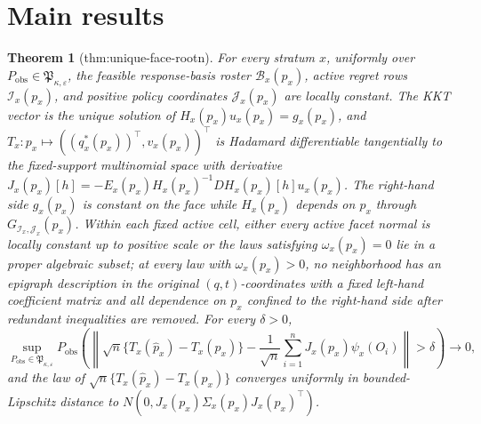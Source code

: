 \documentclass{article}
\newtheorem{theorem}{Theorem}
\begin{document}
\section{Main results}

\begin{theorem}[thm:unique-face-rootn]\label{thm:unique-face-rootn}
For every stratum \(x\), uniformly over \(P_{\mathrm{obs}}\in\mathfrak P_{\kappa,\varepsilon}\), the feasible response-basis roster \(\mathcal B_x(p_x)\), active regret rows \(\mathcal I_x(p_x)\), and positive policy coordinates \(\mathcal J_x(p_x)\) are locally constant. The KKT vector is the unique solution of \(H_x(p_x)u_x(p_x)=g_x(p_x)\), and \(T_x:p_x\mapsto((q_x^*(p_x))^\top,v_x(p_x))^\top\) is Hadamard differentiable tangentially to the fixed-support multinomial space with derivative \(J_x(p_x)[h]=-E_x(p_x)H_x(p_x)^{-1}DH_x(p_x)[h]u_x(p_x)\). The right-hand side \(g_x(p_x)\) is constant on the face while \(H_x(p_x)\) depends on \(p_x\) through \(G_{\mathcal I_x,\mathcal J_x}(p_x)\). Within each fixed active cell, either every active facet normal is locally constant up to positive scale or the laws satisfying \(\omega_x(p_x)=0\) lie in a proper algebraic subset; at every law with \(\omega_x(p_x)>0\), no neighborhood has an epigraph description in the original \((q,t)\)-coordinates with a fixed left-hand coefficient matrix and all dependence on \(p_x\) confined to the right-hand side after redundant inequalities are removed. For every \(\delta>0\), \[\sup_{P_{\mathrm{obs}}\in\mathfrak P_{\kappa,\varepsilon}}P_{\mathrm{obs}}\left(\left\|\sqrt n\{T_x(\widehat p_x)-T_x(p_x)\}-\frac1{\sqrt n}\sum_{i=1}^nJ_x(p_x)\psi_x(O_i)\right\|>\delta\right)\longrightarrow0,\] and the law of \(\sqrt n\{T_x(\widehat p_x)-T_x(p_x)\}\) converges uniformly in bounded-Lipschitz distance to \(N(0,J_x(p_x)\Sigma_x(p_x)J_x(p_x)^\top)\).
\end{theorem}
\end{document}
